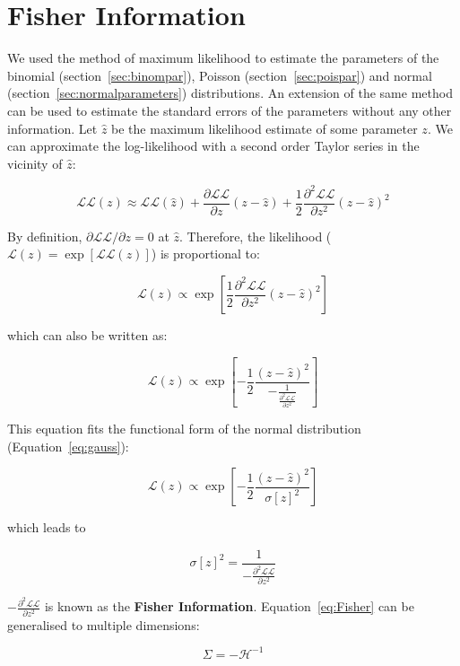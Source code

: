 \section{Fisher Information}
\label{sec:FisherInformation}

We used the method of maximum likelihood to estimate the parameters of
the binomial (section~\ref{sec:binompar}), Poisson
(section~\ref{sec:poispar}) and normal
(section~\ref{sec:normalparameters}) distributions. An extension of
the same method can be used to estimate the standard errors of the
parameters without any other information. Let $\hat{z}$ be the maximum
likelihood estimate of some parameter $z$. We can approximate the
log-likelihood with a second order Taylor series in the vicinity of
$\hat{z}$:

\[
  \mathcal{LL}(z) \approx \mathcal{LL}(\hat{z}) +
  \frac{\partial\mathcal{LL}}{\partial{z}} (z-\hat{z}) +
  \frac{1}{2} \frac{\partial^2\mathcal{LL}}{\partial{z^2}} (z-\hat{z})^2
\]

By definition, $\partial{\mathcal{LL}}/\partial{z}=0$ at
$\hat{z}$. Therefore, the likelihood ($\mathcal{L}(z) =
\exp[\mathcal{LL}(z)]$) is proportional to:

\[
\mathcal{L}(z) \propto 
\exp\left[
  \frac{1}{2} \frac{\partial^2\mathcal{LL}}{\partial{z^2}} (z-\hat{z})^2
  \right]
\]

\noindent which can also be written as:

\[
\mathcal{L}(z) \propto \exp\!\left[
  -\frac{1}{2} \frac{(z-\hat{z})^2}{
    -\frac{1}{\frac{\partial^2\mathcal{LL}}{\partial{z^2}}}
  }\right]
\]

This equation fits the functional form of the normal distribution
(Equation~\ref{eq:gauss}):

\[
\mathcal{L}(z) \propto \exp\!\left[
  -\frac{1}{2} \frac{(z-\hat{z})^2}{\sigma[z]^2}
  \right]
\]

\noindent which leads to

\begin{equation}
  \sigma[z]^2 = \frac{1}{-\frac{\partial^2\mathcal{LL}}{\partial{z^2}}}
  \label{eq:Fisher}
\end{equation}

$-\frac{\partial^2\mathcal{LL}}{\partial{z^2}}$ is known as the
\textbf{Fisher Information}. Equation~\ref{eq:Fisher} can be
generalised to multiple dimensions:

\begin{equation}
  \Sigma = -\mathcal{H}^{-1}
  \label{eq:multidimFisher}
\end{equation}

